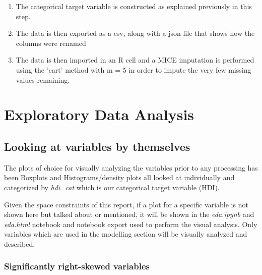 \documentclass[]{article}
\begin{document}
\begin{enumerate}
  \item The categorical target variable is constructed as explained previously in this step.

  \item The data is then exported as a csv, along with a json file that shows how the columns were renamed

  \item The data is then imported in an R cell and a MICE imputation is performed using the 'cart' method with m = 5 in order to impute the very few missing values remaining.
\end{enumerate}

\newpage

\hypertarget{exploratory-data-analysis}{%
\section{Exploratory Data Analysis}\label{exploratory-data-analysis}}

\hypertarget{looking-at-variables-by-themselves}{%
\subsection{Looking at variables by
themselves}\label{looking-at-variables-by-themselves}}

The plots of choice for visually analyzing the variables prior to any
processing has been Boxplots and Histograms/density plots all looked at
individually and categorized by \emph{hdi\_cat} which is our categorical
target variable (HDI).

Given the space constraints of this report, if a plot for a specific
variable is not shown here but talked about or mentioned, it will be
shown in the \emph{eda.ipynb} and \emph{eda.html} notebook and notebook
export used to perform the visual analysis. Only variables which are
used in the modelling section will be visually analyzed and described.

\hypertarget{significantly-right-skewed-variables}{%
\subsubsection{Significantly right-skewed
variables}\label{significantly-right-skewed-variables}}
\end{document}
